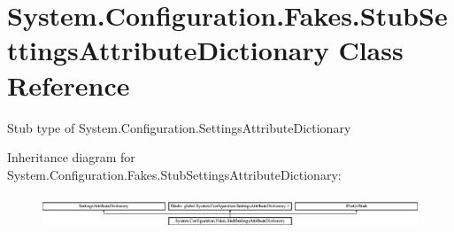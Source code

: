 \hypertarget{class_system_1_1_configuration_1_1_fakes_1_1_stub_settings_attribute_dictionary}{\section{System.\-Configuration.\-Fakes.\-Stub\-Settings\-Attribute\-Dictionary Class Reference}
\label{class_system_1_1_configuration_1_1_fakes_1_1_stub_settings_attribute_dictionary}
}


Stub type of System.\-Configuration.\-Settings\-Attribute\-Dictionary 


Inheritance diagram for System.\-Configuration.\-Fakes.\-Stub\-Settings\-Attribute\-Dictionary\-:\begin{figure}[H]
\begin{center}
\leavevmode
\includegraphics[height=0.974761cm]{class_system_1_1_configuration_1_1_fakes_1_1_stub_settings_attribute_dictionary}
\end{center}
\end{figure}
